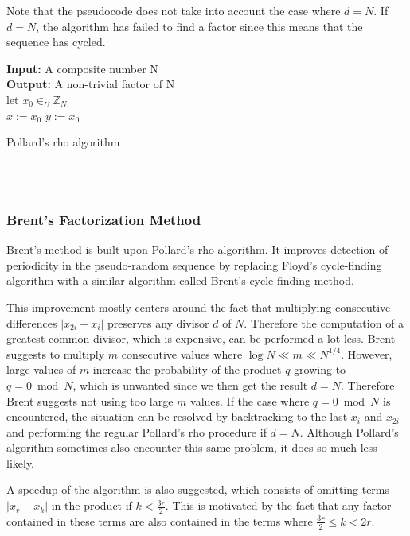 \documentclass[paper=a4, fontsize=11pt,numbers=endperiod]{scrartcl} %
\providecommand{\abs}[1]{\lvert#1\rvert} %
\numberwithin{equation}{section} %
\numberwithin{figure}{section} %
\numberwithin{table}{section} %
\begin{document}
Note that the pseudocode does not take into account the case where $d = N$.
If $d = N$, the algorithm has failed to find a factor since this means that the sequence has cycled.

\begin{algorithm}[H]
 \SetAlgoLined %
 \textbf{Input:} {A composite number N}\\
 \textbf{Output:} {A non-trivial factor of N}\\
 let $x_0 \in_U \mathbb{Z}_N$\\ 
 $x := x_0$\;
 $y := x_0$\;
 \While{True}{
  $x := f(x)$\;
  $y := f(f(y))$\;
  $d := gcd( \abs{y-x}, N)$\;
  \If{$d > 1$}{
   return d\;
   }
 }
 \caption{Pollard's rho algorithm \cite{algnotes}}
\end{algorithm}
\hspace{0pt}\\\\


\subsubsection{Brent's Factorization Method}
Brent's method is built upon Pollard's rho algorithm.
It improves detection of periodicity in the pseudo-random sequence by replacing Floyd's cycle-finding algorithm with a similar algorithm called Brent's cycle-finding method. \cite{brent}

This improvement mostly centers around the fact that multiplying consecutive differences $\abs{x_{2i}-x_i}$ preserves any divisor $d$ of $N$.
Therefore the computation of a greatest common divisor, which is expensive, can be performed a lot less.
Brent suggests to multiply $m$ consecutive values where $\log{N} \ll m \ll N^{1/4}$.
However, large values of $m$ increase the probability of the product $q$ growing to $q = 0 \bmod N$, which is unwanted since we then get the result $d=N$.
Therefore Brent suggests not using too large $m$ values.
If the case where $q = 0 \bmod N$ is encountered, the situation can be resolved by backtracking to the last $x_i$ and $x_{2i}$ and performing the regular Pollard's rho procedure if $d=N$.
Although Pollard's algorithm sometimes also encounter this same problem, it does so much less likely.

A speedup of the algorithm is also suggested, which consists of omitting terms $\abs{x_r - x_k}$ in the product if $ k < \frac{3r}{2}$.
This is motivated by the fact that any factor contained in these terms are also contained in the terms where $\frac{3r}{2} \le k < 2r$.
\end{document}

